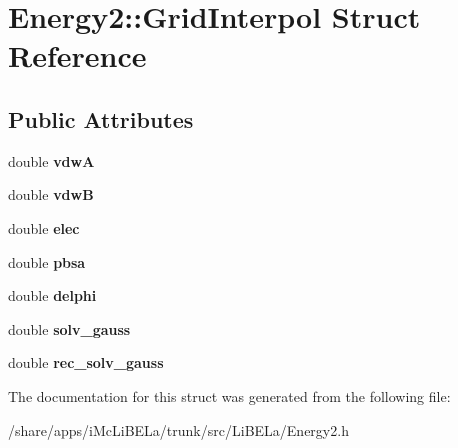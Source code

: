 \hypertarget{structEnergy2_1_1GridInterpol}{
\section{Energy2::GridInterpol Struct Reference}
\label{structEnergy2_1_1GridInterpol}
}
\subsection*{Public Attributes}
\begin{DoxyCompactItemize}
\item 
\hypertarget{structEnergy2_1_1GridInterpol_ad1fced7cbaa732a67febd3e381bdb5d9}{
double {\bfseries vdwA}}
\label{structEnergy2_1_1GridInterpol_ad1fced7cbaa732a67febd3e381bdb5d9}

\item 
\hypertarget{structEnergy2_1_1GridInterpol_ab1e186b3676fa2211564ddd723c3fec0}{
double {\bfseries vdwB}}
\label{structEnergy2_1_1GridInterpol_ab1e186b3676fa2211564ddd723c3fec0}

\item 
\hypertarget{structEnergy2_1_1GridInterpol_aa810dc30d4178cf38c1b6e8f201099c9}{
double {\bfseries elec}}
\label{structEnergy2_1_1GridInterpol_aa810dc30d4178cf38c1b6e8f201099c9}

\item 
\hypertarget{structEnergy2_1_1GridInterpol_a1c5810f0a48f86e8c4201a90e645ce32}{
double {\bfseries pbsa}}
\label{structEnergy2_1_1GridInterpol_a1c5810f0a48f86e8c4201a90e645ce32}

\item 
\hypertarget{structEnergy2_1_1GridInterpol_a4255ba60f96aff3662b262705cb328af}{
double {\bfseries delphi}}
\label{structEnergy2_1_1GridInterpol_a4255ba60f96aff3662b262705cb328af}

\item 
\hypertarget{structEnergy2_1_1GridInterpol_afb716d0908a73dce2f1a88d8345f1fa4}{
double {\bfseries solv\_\-gauss}}
\label{structEnergy2_1_1GridInterpol_afb716d0908a73dce2f1a88d8345f1fa4}

\item 
\hypertarget{structEnergy2_1_1GridInterpol_a8d4b82731caa037b4ffe35984c1e22af}{
double {\bfseries rec\_\-solv\_\-gauss}}
\label{structEnergy2_1_1GridInterpol_a8d4b82731caa037b4ffe35984c1e22af}

\end{DoxyCompactItemize}


The documentation for this struct was generated from the following file:\begin{DoxyCompactItemize}
\item 
/share/apps/iMcLiBELa/trunk/src/LiBELa/Energy2.h\end{DoxyCompactItemize}
